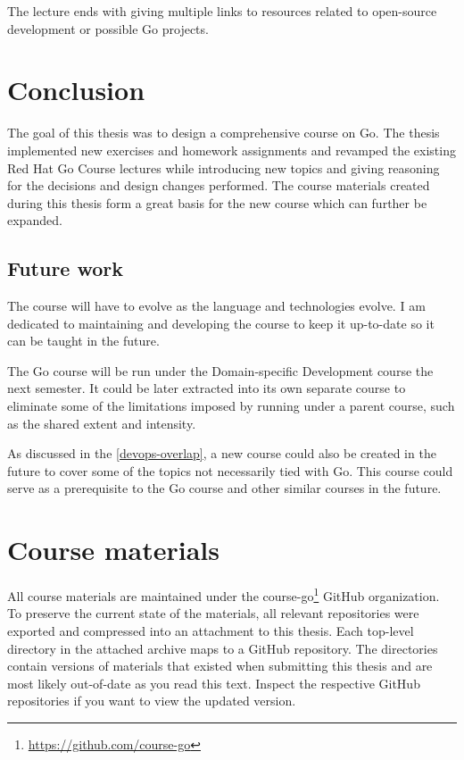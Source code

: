 \documentclass[
  digital,
  color,
  oneside,
  nosansbold,
  nocolorbold,
  lof,
  nolot,
]{fithesis4}
\begin{document}
The lecture ends with giving multiple links to resources related to open-source development or possible Go projects.

\chapter{Conclusion}\label{chapter-conclusion}

The goal of this thesis was to design a comprehensive course on Go. The thesis implemented new exercises and homework assignments and revamped the existing Red Hat Go Course lectures while introducing new topics and giving reasoning for the decisions and design changes performed. The course materials created during this thesis form a great basis for the new course which can further be expanded.

\section{Future work}

The course will have to evolve as the language and technologies evolve. I am dedicated to maintaining and developing the course to keep it up-to-date so it can be taught in the future.

The Go course will be run under the Domain-specific Development course the next semester. It could be later extracted into its own separate course to eliminate some of the limitations imposed by running under a parent course, such as the shared extent and intensity.

As discussed in the \cref{devops-overlap}, a new course could also be created in the future to cover some of the topics not necessarily tied with Go. This course could serve as a prerequisite to the Go course and other similar courses in the future.

\printbibliography[heading=bibintoc]

\appendix
\chapter{Course materials}\label{apendix-materials}

All course materials are maintained under the course-go\footnote{\url{https://github.com/course-go}} GitHub organization. To preserve the current state of the materials, all relevant repositories were exported and compressed into an attachment to this thesis. Each top-level directory in the attached archive maps to a GitHub repository. The directories contain versions of materials that existed when submitting this thesis and are most likely out-of-date as you read this text. Inspect the respective GitHub repositories if you want to view the updated version.
\end{document}
